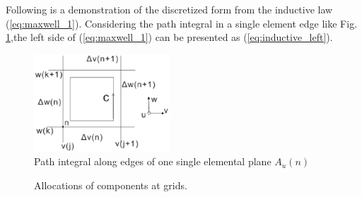 
Following is a demonstration of the discretized form from the inductive law (\ref{eq:maxwell_1}). Considering the path integral in a single element edge like Fig.  \ref{fig:FIT_max_integral1},the left side of (\ref{eq:maxwell_1}) can be presented as  (\ref{eq:inductive_left}). 

\begin{figure}[!ht]
\centering
\includegraphics[width=0.45\textwidth]{bilder/FIT_max_integral1}
\caption{ Path integral along edges of one single elemental plane $A_{u}(n)$\cite{ script_FeldSim}}
\label{fig:FIT_max_integral1}
\end{figure}

\begin{figure}[!ht]
\centering
{}
\hfill
{}
\caption{Allocations of components at grids\cite{ script_FeldSim}.}
\end{figure}

